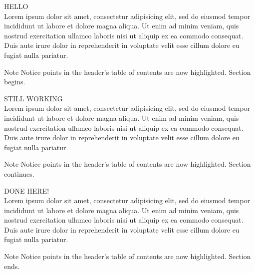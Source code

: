 {
\begin{multicols}{2}
HELLO \\
Lorem ipsum dolor sit amet, consectetur adipisicing elit, sed do eiusmod tempor incididunt ut labore et dolore magna aliqua. Ut enim ad minim veniam, quis nostrud exercitation ullamco laboris nisi ut aliquip ex ea commodo consequat. Duis aute irure dolor in reprehenderit in voluptate velit esse cillum dolore eu fugiat nulla pariatur.
\end{multicols}

\begin{block}{Note}
Notice points in the header's table of contents are now highlighted.
Section begins.
\end{block}
}


{
\begin{multicols}{2}
STILL WORKING \\
Lorem ipsum dolor sit amet, consectetur adipisicing elit, sed do eiusmod tempor incididunt ut labore et dolore magna aliqua. Ut enim ad minim veniam, quis nostrud exercitation ullamco laboris nisi ut aliquip ex ea commodo consequat. Duis aute irure dolor in reprehenderit in voluptate velit esse cillum dolore eu fugiat nulla pariatur.
\end{multicols}

\begin{block}{Note}
Notice points in the header's table of contents are now highlighted.
Section continues.
\end{block}
}


{
\begin{multicols}{2}
DONE HERE! \\
Lorem ipsum dolor sit amet, consectetur adipisicing elit, sed do eiusmod tempor incididunt ut labore et dolore magna aliqua. Ut enim ad minim veniam, quis nostrud exercitation ullamco laboris nisi ut aliquip ex ea commodo consequat. Duis aute irure dolor in reprehenderit in voluptate velit esse cillum dolore eu fugiat nulla pariatur.
\end{multicols}

\begin{block}{Note}
Notice points in the header's table of contents are now highlighted.
Section ends.
\end{block}
}
